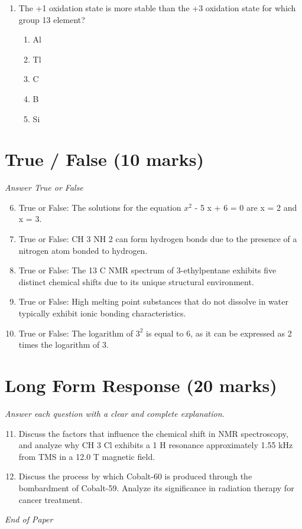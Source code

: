 \documentclass[12pt]{article}
\begin{document}
\begin{enumerate}[label=\arabic*.]
\begin{enumerate}[label=(\alph*)]
    \item $1.25 \times 10^3$ $\mathrm{K}$
    \item $1.20 \times 10^3$ $\mathrm{K}$
    \item $1.41 \times 10^3$ $\mathrm{K}$
    \item $1.10 \times 10^3$ $\mathrm{K}$
    \item $1.65 \times 10^3$ $\mathrm{K}$
\end{enumerate}
\item The +1 oxidation state is more stable than the +3 oxidation state for which group 13 element?
\begin{enumerate}[label=(\alph*)]
    \item Al
    \item Tl
    \item C
    \item B
    \item Si
\end{enumerate}
\end{enumerate}

\section*{True / False (10 marks)}
\textit{Answer True or False}
\begin{enumerate}[label=\arabic*.]
\setcounter{enumi}{5}
\item True or False: The solutions for the equation $x^2$ - 5 x + 6 = 0 are x = 2 and x = 3.
\item True or False: CH 3 NH 2 can form hydrogen bonds due to the presence of a nitrogen atom bonded to hydrogen.
\item True or False: The 13 C NMR spectrum of 3-ethylpentane exhibits five distinct chemical shifts due to its unique structural environment.
\item True or False: High melting point substances that do not dissolve in water typically exhibit ionic bonding characteristics.
\item True or False: The logarithm of $3^2$ is equal to 6, as it can be expressed as 2 times the logarithm of 3.
\end{enumerate}

\section*{Long Form Response (20 marks)}
\textit{Answer each question with a clear and complete explanation.}
\begin{enumerate}[label=\arabic*.]
\setcounter{enumi}{10}
\item Discuss the factors that influence the chemical shift in NMR spectroscopy, and analyze why CH 3 Cl exhibits a 1 H resonance approximately 1.55 kHz from TMS in a 12.0 T magnetic field.
\item Discuss the process by which Cobalt-60 is produced through the bombardment of Cobalt-59. Analyze its significance in radiation therapy for cancer treatment.
\end{enumerate}

\vfill
\noindent\textit{End of Paper}
\end{document}
